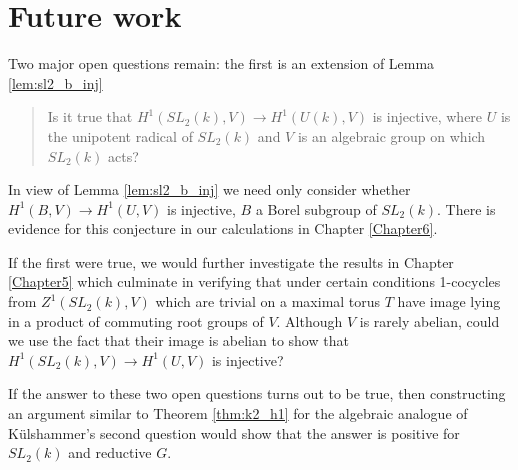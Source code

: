 
\chapter{Future work}
\label{Chapter7}

Two major open questions remain: the first is an extension of Lemma \ref{lem:sl2_b_inj}
\begin{quote}
  Is it true that $H^1(SL_2(k), V) \rightarrow H^1(U(k), V)$ is injective, where $U$ is the unipotent radical of $SL_2(k)$ and $V$ is an algebraic group on which $SL_2(k)$ acts?
\end{quote}

In view of Lemma \ref{lem:sl2_b_inj} we need only consider whether $H^1(B, V) \rightarrow H^1(U, V)$ is injective, $B$ a Borel subgroup of $SL_2(k)$. There is evidence for this conjecture in our calculations in Chapter \ref{Chapter6}.

If the first were true, we would further investigate the results in Chapter \ref{Chapter5} which culminate in verifying that under certain conditions 1-cocycles from $Z^1(SL_2(k), V)$ which are trivial on a maximal torus $T$ have image lying in a product of commuting root groups of $V$. Although $V$ is rarely abelian, could we use the fact that their image is abelian to show that $H^1(SL_2(k), V) \rightarrow H^1(U, V)$ is injective?

If the answer to these two open questions turns out to be true, then constructing an argument similar to Theorem \ref{thm:k2_h1} for the algebraic analogue of K\"ulshammer's second question would show that the answer is positive for $SL_2(k)$ and reductive $G$.
